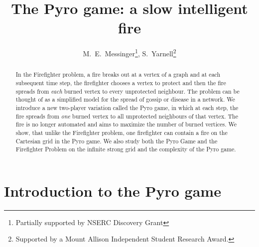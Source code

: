 \documentclass[12pt]{article}
\begin{document}
\title{The Pyro game: a slow intelligent fire}

\author{M.~E.~Messinger\thanks{Partially supported by NSERC Discovery Grant}, S.~Yarnell\thanks{Supported by a Mount Allison Independent Student Research Award.}}

\date{}

\maketitle


\begin{abstract}  
In the Firefighter problem, a fire breaks out at a vertex of a graph and at each subsequent time step, the firefighter chooses a vertex to protect and then the fire spreads from \emph{each} burned vertex to every unprotected neighbour.  The problem can be thought of as a simplified model for the spread of gossip or disease in a network.  We introduce a new two-player variation called the Pyro game, in which at each step, the fire spreads from \emph{one} burned vertex to all unprotected neighbours of that vertex.  The fire is no longer automated and aims to maximize the number of burned vertices.  We show, that unlike the Firefighter problem, one firefighter can contain a fire on the Cartesian grid in the Pyro game.  We also study both the Pyro Game and the Firefighter Problem on the infinite strong grid and   the complexity of the Pyro game.



\end{abstract}

\section{Introduction to the Pyro game}\label{sec:intro}
\end{document}
